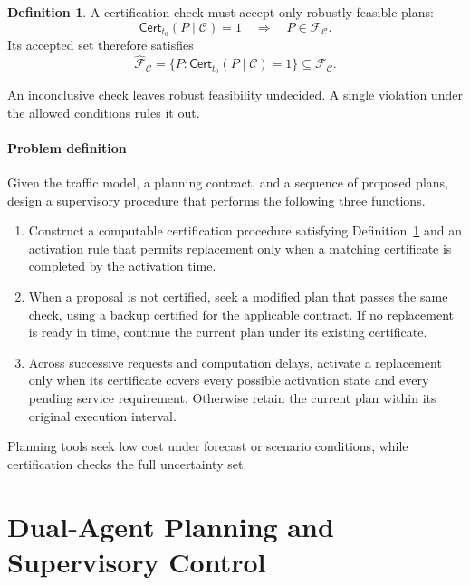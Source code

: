 \documentclass[preprint,12pt]{elsarticle}
\theoremstyle{definition}
\theoremstyle{plain}
\theoremstyle{definition}
\newtheorem{definition}{Definition}
\theoremstyle{plain}
\begin{document}
\begin{definition}
\label{def:feasibility-certificate}
A certification check must accept only robustly feasible plans:
\[
\mathsf{Cert}_{t_0}(P\mid\mathcal C)=1
\quad\Longrightarrow\quad P\in\mathcal F_{\mathcal C}.
\]
Its accepted set therefore satisfies
\begin{equation}
\widehat{\mathcal F}_{\mathcal C}
=\{P:\mathsf{Cert}_{t_0}(P\mid\mathcal C)=1\}
\subseteq\mathcal F_{\mathcal C}.
\label{eq:benchmark-certifiable-set}
\end{equation}
\end{definition}
An inconclusive check leaves robust feasibility undecided. A single
violation under the allowed conditions rules it out.

\paragraph{Problem definition}
\label{prob:supervised-planning}
Given the traffic model, a planning contract, and a sequence of proposed
plans, design a supervisory procedure that performs the following three
functions.
\begin{enumerate}
\item Construct a computable certification procedure satisfying
Definition~\ref{def:feasibility-certificate} and an activation rule that
permits replacement only when a matching certificate is completed by
the activation time.
\item When a proposal is not certified, seek a modified plan that passes
the same check, using a backup certified for the applicable contract.
If no replacement is ready in time, continue the current plan under
its existing certificate.
\item Across successive requests and computation delays, activate a
replacement only when its certificate covers every possible activation
state and every pending service requirement. Otherwise retain
the current plan within its original execution interval.
\end{enumerate}
Planning tools seek low cost under forecast or scenario conditions,
while certification checks the full uncertainty set.

\section{Dual-Agent Planning and Supervisory Control}
\label{sec:new-agent}
\end{document}

